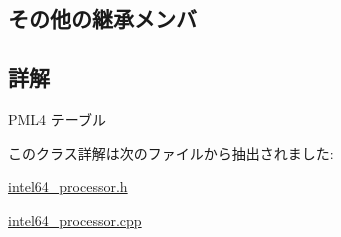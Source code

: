 \subsection*{その他の継承メンバ}


\subsection{詳解}
P\+M\+L4 テーブル 

このクラス詳解は次のファイルから抽出されました\+:\begin{DoxyCompactItemize}
\item 
\hyperlink{intel64__processor_8h}{intel64\+\_\+processor.\+h}\item 
\hyperlink{intel64__processor_8cpp}{intel64\+\_\+processor.\+cpp}\end{DoxyCompactItemize}

